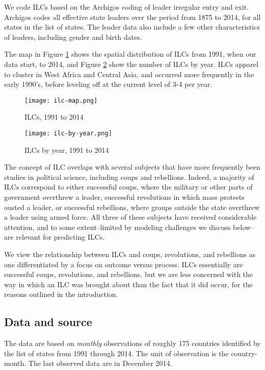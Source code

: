 \documentclass[pdftex,11pt]{article}
\begin{document}
We code ILCs based on the Archigos coding of leader irregular entry and exit. Archigos codes all effective state leaders over the period from 1875 to 2014, for all states in the \citet{gleditsch:ward:1999} list of states. The leader data also include a few other characteristics of leaders, including gender and birth dates. 

The map in Figure \ref{fig:ilc} shows the spatial distribution of ILCs from 1991, when our data start, to 2014, and Figure \ref{ilc-timeline} show the number of ILCs by year. ILCs apparel to cluster in West Africa and Central Asia, and occurred more frequently in the early 1990's, before leveling off at the current level of 3-4 per year. 

\begin{figure}
\texttt{[image: ilc-map.png]}
\caption{ILCs, 1991 to 2014}
\label{fig:ilc}
\end{figure}

\begin{figure}
\texttt{[image: ilc-by-year.png]}
\caption{ILCs by year, 1991 to 2014}
\label{ilc-timeline}
\end{figure}

The concept of ILC overlaps with several subjects that have more frequently been studies in political science, including coups and rebellions. Indeed, a majority of ILCs correspond to either successful coups, where the military or other parts of government overthrew a leader, successful revolutions in which mass protests ousted a leader, or successful rebellions, where groups outside the state overthrew a leader using armed force. All three of these subjects have received considerable attention, and to some extent--limited by modeling challenges we discuss below--are relevant for predicting ILCs. 

We view the relationship between ILCs and coups, revolutions, and rebellions as one differentiated by a focus on outcome versus process. ILCs essentially are successful coups, revolutions, and rebellions, but we are less concerned with the way in which an ILC was brought about than the fact that it did occur, for the reasons outlined in the introduction.

\subsection{Data and source}

The data are based on \textit{monthly} observations of roughly 175 countries identified by the \citet{gleditsch:ward:1999} list of states from 1991 through 2014. The unit of observation is the country-month. The last observed data are in December 2014. 
\end{document}
